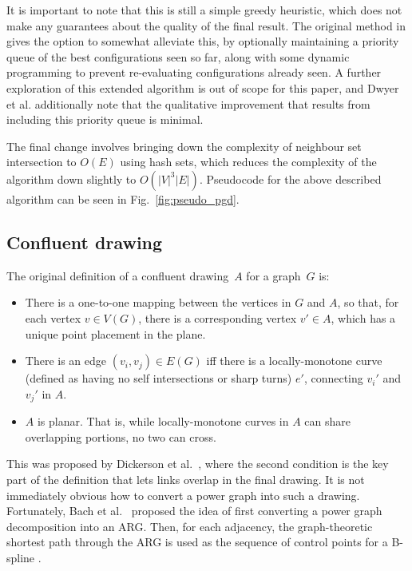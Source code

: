 It is important to note that this is still a simple greedy heuristic, which does not make any guarantees about the quality of the final result.
The original method in \cite{Dwyer2014} gives the option to somewhat alleviate this, by optionally maintaining a priority queue of the best configurations seen so far, along with some dynamic programming to prevent re-evaluating configurations already seen.
A further exploration of this extended algorithm is out of scope for this paper, and Dwyer et al. \cite{Dwyer2014} additionally note that the qualitative improvement that results from including this priority queue is minimal.

The final change involves bringing down the complexity of neighbour set intersection to $O(E)$ using hash sets, which reduces the complexity of the algorithm down slightly to $O(|V|^3|E|)$.
Pseudocode for the above described algorithm can be seen in Fig.~\ref{fig:pseudo_pgd}.

\subsection{Confluent drawing}
\label{sec:confluent_definition}
The original definition of a confluent drawing~$A$ for a graph~$G$ is:
\begin{mdframed}[backgroundcolor=WhiteSmoke]
\begin{itemize}[leftmargin=*]
  \item There is a one-to-one mapping between the vertices in $G$ and $A$, so that, for each vertex $v\in V(G)$, there is a corresponding vertex $v'\in A$, which has a unique point placement in the plane.
  \item There is an edge $(v_i,v_j) \in E(G)$ iff there is a locally-monotone curve (defined as having no self intersections or sharp turns) $e'$, connecting $v_i'$ and $v_j'$ in $A$. 
  \item $A$ is planar. That is, while locally-monotone curves in $A$ can share overlapping portions, no two can cross.
\end{itemize}
\end{mdframed}
This was proposed by Dickerson et al.\ \cite{Dickerson2005}, where the second condition is the key part of the definition that lets links overlap in the final drawing.
It is not immediately obvious how to convert a power graph into such a drawing. Fortunately, Bach et al.\ \cite{Bach2017} proposed the idea of first converting a power graph decomposition into an ARG. Then, for each adjacency, the graph-theoretic shortest path through the ARG is used as the sequence of control points for a B-spline \cite{Sederberg2005}.


